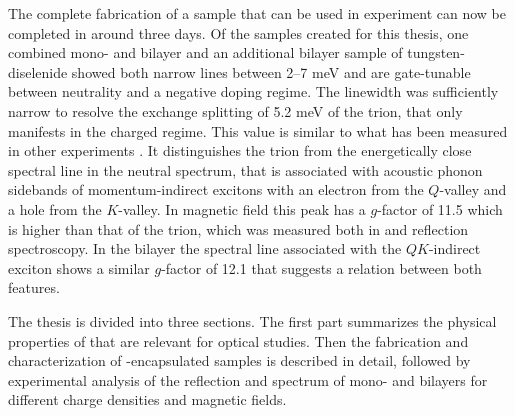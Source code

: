 The complete fabrication of a sample that can be used in experiment can now be completed in around three days. Of the samples created for this thesis, one combined mono- and bilayer and an additional bilayer sample of tungsten-diselenide showed both narrow lines between 2--7 meV and are gate-tunable between neutrality and a negative doping regime. The linewidth was sufficiently narrow to resolve the exchange splitting of 5.2 meV of the trion, that only manifests in the charged regime. This value is similar to what has been measured in other experiments \cite{courtade_charged_2017}. It distinguishes the trion from the energetically close spectral line in the neutral spectrum, that is associated with acoustic phonon sidebands of momentum-indirect excitons with an electron from the $Q$-valley and a hole from the $K$-valley. In magnetic field this peak has a $g$-factor of 11.5 which is higher than that of the trion, which was measured both in \pl and reflection spectroscopy. In the bilayer the spectral line associated with the $QK$-indirect exciton shows a similar $g$-factor of 12.1 that suggests a relation between both features.

The thesis is divided into three sections. The first part summarizes the physical properties of \tmds that are relevant for optical studies. Then the fabrication and characterization of \hbn-encapsulated samples is described in detail, followed by experimental analysis of the reflection and \pl spectrum of \wse mono- and bilayers for different charge densities and magnetic fields.




